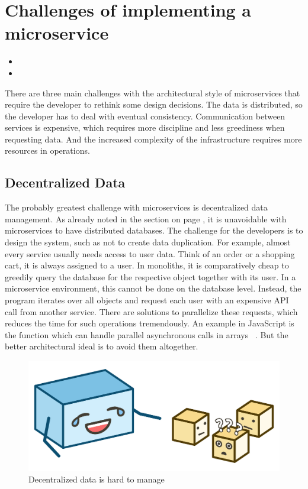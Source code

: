 \section{Challenges of implementing a microservice}

\begin{itemize}
  \item {}
  \item {}
\end{itemize}

There are three main challenges with the architectural style of microservices that require the developer to rethink some design decisions. The data is distributed, so the developer has to deal with eventual consistency. Communication between services is expensive, which requires more discipline and less greediness when requesting data. And the increased complexity of the infrastructure requires more resources in operations.


\subsection{Decentralized Data}
\label{sec:theory:challenges:data}

The probably greatest challenge with microservices is decentralized data management. As already noted in the section on page \pageref{sec:theory:decentralized-data}, it is unavoidable with microservices to have distributed databases. The challenge for the developers is to design the system, such as not to create data duplication. For example, almost every service usually needs access to user data. Think of an order or a shopping cart, it is always assigned to a user. In monoliths, it is comparatively cheap to greedily query the database for the respective object together with its user. In a microservice environment, this cannot be done on the database level. Instead, the program iterates over all objects and request each user with an expensive API call from another service. There are solutions to parallelize these requests, which reduces the time for such operations tremendously. An example in JavaScript is the  function which can handle parallel asynchronous calls in arrays ~\cite{mdn.2020}. But the better architectural ideal is to avoid them altogether.

\begin{figure}[ht]
  \centering
  \includegraphics[width=0.55\linewidth]{assets/illustration-decentralized-data.png}
  \caption{Decentralized data is hard to manage}
\end{figure}

